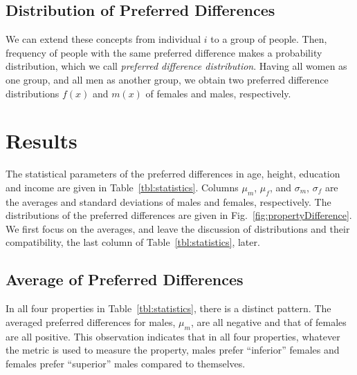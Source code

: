 \documentclass[journal,comsoc]{IEEEtran}
\newcommand{\hbIdea}[1]{{\color{red}{\scriptsize [{#1}]}}}
\newcommand{\reffig}[1]{Fig.~\ref{#1}}
\newcommand{\reftbl}[1]{Table~\ref{#1}}
\begin{document}
\subsection{Distribution of Preferred Differences}

\hbIdea{property distribution} %
We can extend these concepts from individual $i$ to a group of people.
Then, frequency of people with the same preferred difference 
makes a probability distribution,
which we call \emph{preferred difference distribution}.
Having 
all women as one group, and 
all men as another group,
we obtain two preferred difference distributions
$f(x)$ and $m(x)$ of females and males, respectively. 




\section{Results}

\hbIdea{findings} %
The statistical parameters of the preferred differences in 
age, height, education and income are given in
\reftbl{tbl:statistics}.
Columns 
$\mu_{m}$,  $\mu_{f}$, 
and
$\sigma_{m}$, $\sigma_{f}$ are the
averages and standard deviations of males and females, respectively.
The distributions of the preferred differences
are given in  \reffig{fig:propertyDifference}.
We first focus on the averages,
and leave the discussion of 
distributions and 
their compatibility, 
the last column of \reftbl{tbl:statistics}, 
later.




\subsection{Average of Preferred Differences}

In all four properties in \reftbl{tbl:statistics},
there is a distinct pattern.
The averaged preferred differences 
for males, $\mu_{m}$, are all negative 
and
that of females are all positive. 
This observation indicates that in all four properties, 
whatever the metric is used to measure the property,
males prefer ``inferior'' females
and females prefer ``superior'' males compared to themselves.
\end{document}
